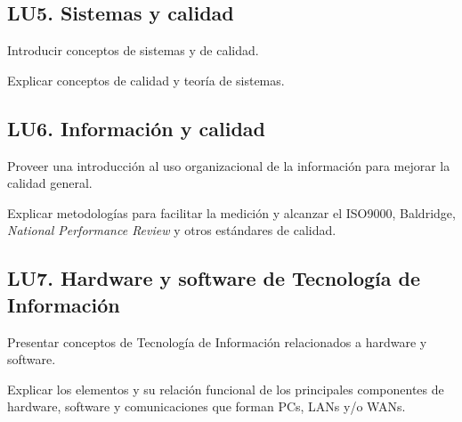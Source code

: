 \subsection{LU5. Sistemas y calidad}\label{sec:BOK-LU5}\label{sec:LU5}
\begin{LearningUnit}
\begin{LUGoal}
\item Introducir conceptos de sistemas y de calidad.
\end{LUGoal}

\begin{LUObjective}
\item Explicar conceptos de calidad y teoría de sistemas.
\end{LUObjective}
\end{LearningUnit}

\subsection{LU6. Información y calidad}\label{sec:BOK-LU6}\label{sec:LU6}
\begin{LearningUnit}
\begin{LUGoal}
\item Proveer una introducción al uso organizacional de la información para mejorar la calidad general.
\end{LUGoal}

\begin{LUObjective}
\item Explicar metodologías para facilitar la medición y alcanzar el ISO9000, Baldridge, \textit{National Performance Review} y otros estándares de calidad.
\end{LUObjective}
\end{LearningUnit}

\subsection{LU7. Hardware y software de Tecnología de Información}\label{sec:BOK-LU7}\label{sec:LU7}
\begin{LearningUnit}
\begin{LUGoal}
\item Presentar conceptos de Tecnología de Información relacionados a hardware y software.
\end{LUGoal}

\begin{LUObjective}
\item Explicar los elementos y su relación funcional de los principales componentes de hardware, software y comunicaciones que forman PCs, LANs y/o WANs.
\end{LUObjective}
\end{LearningUnit}

